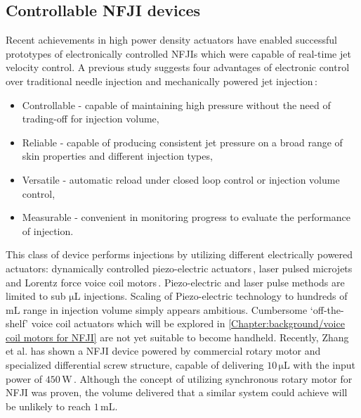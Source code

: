     \subsection{Controllable \acs{NFJI} devices}    \label{Chapter:background/needle-free jet injection/Controllable NFJI}
    
        Recent achievements in high power density actuators have enabled successful prototypes of electronically controlled \acsp{NFJI} which were capable of real-time jet velocity control. A previous study suggests four advantages of electronic control over traditional needle injection and mechanically powered jet injection\,\cite{henmond2013}:
        
        \begin{itemize}
            \item Controllable - capable of maintaining high pressure without the need of trading-off for injection volume,
            \item Reliable - capable of producing consistent jet pressure on a broad range of skin properties and different injection types,
            \item Versatile - automatic reload under closed loop control or injection volume control,
            \item Measurable - convenient in monitoring progress to evaluate the performance of injection.
        \end{itemize}
        
        This class of device performs injections by utilizing different electrically powered actuators: dynamically controlled piezo-electric actuators\,\cite{Stachowiak2009}, laser pulsed microjets\,\cite{tawaga2013, park2012} and Lorentz force voice coil motors\,\cite{taberner2006,hemond2006}. Piezo-electric and laser pulse methods are limited to sub $\mathrm{\mu L}$ injections. Scaling of Piezo-electric technology to hundreds of $\mathrm{mL}$ range in injection volume simply appears ambitious. Cumbersome ‘off-the-shelf’ voice coil actuators which will be explored in \ref{Chapter:background/voice coil motors for NFJI} are not yet suitable to become handheld. Recently, Zhang et al. has shown a \acs{NFJI} device powered by commercial rotary motor and specialized differential screw structure, capable of delivering $10\,\mathrm{\mu L}$ with the input power of $450\,\mathrm{W}$\,\cite{Zhang2017Needle-freeActuator}. Although the concept of utilizing synchronous rotary motor for \acs{NFJI} was proven, the volume delivered that a similar system could achieve will be unlikely to reach $1\,\mathrm{mL}$.

